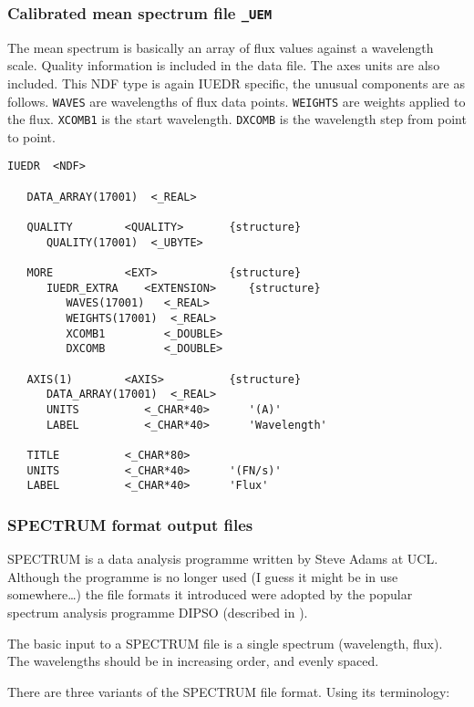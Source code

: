 \subsubsection{Calibrated mean spectrum file {\tt \_UEM}}

The mean spectrum is basically an array of flux values against a wavelength
scale.  Quality information is included in the data file.  The axes units are
also included.
This NDF type is again IUEDR specific, the unusual components are as follows.
{\tt WAVES} are wavelengths of flux data points.
{\tt WEIGHTS} are weights applied to the flux.
{\tt XCOMB1} is the start wavelength.
{\tt DXCOMB} is the wavelength step from point to point.



\begin{verbatim}
IUEDR  <NDF>

   DATA_ARRAY(17001)  <_REAL>

   QUALITY        <QUALITY>       {structure}
      QUALITY(17001)  <_UBYTE>

   MORE           <EXT>           {structure}
      IUEDR_EXTRA    <EXTENSION>     {structure}
         WAVES(17001)   <_REAL>
         WEIGHTS(17001)  <_REAL>
         XCOMB1         <_DOUBLE>
         DXCOMB         <_DOUBLE>

   AXIS(1)        <AXIS>          {structure}
      DATA_ARRAY(17001)  <_REAL>
      UNITS          <_CHAR*40>      '(A)'
      LABEL          <_CHAR*40>      'Wavelength'

   TITLE          <_CHAR*80>
   UNITS          <_CHAR*40>      '(FN/s)'
   LABEL          <_CHAR*40>      'Flux'
\end{verbatim}

\subsubsection{\label{se:spectrum}SPECTRUM format output files}

SPECTRUM is a data analysis programme written by Steve Adams at UCL\@.
Although the programme is no longer used (I guess it might be in use
somewhere\ldots) the file formats it introduced were adopted by the popular
spectrum analysis programme DIPSO (described in )\@.

The basic input to a SPECTRUM file is a single spectrum (wavelength, flux)\@.
The wavelengths should be in increasing order, and evenly spaced.

There are three variants of the SPECTRUM file format.  Using its terminology:

